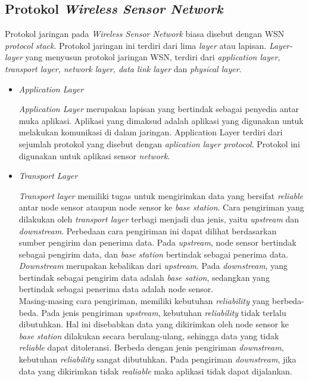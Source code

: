 \subsection{Protokol \textit{Wireless Sensor Network}}
Protokol jaringan pada \textit{Wireless Sensor Network} biasa disebut dengan WSN \textit{protocol stack}. Protokol jaringan ini terdiri dari lima \textit{layer} atau lapisan. \textit{Layer-layer} yang menyusun protokol jaringan WSN, terdiri dari \textit{application layer, transport layer, network layer, data link layer} dan \textit{physical layer}.

\begin{itemize}
    \item \textit{Application Layer}
    
    \textit{Application Layer} merupakan lapisan yang bertindak sebagai penyedia antar muka aplikasi. Aplikasi yang dimaksud adalah aplikasi yang digunakan untuk melakukan komunikasi di dalam jaringan. Application Layer terdiri dari sejumlah protokol yang disebut dengan \textit{aplication layer protocol}. Protokol ini digunakan untuk aplikasi sensor \textit{network}.
    
    \item \textit{Transport Layer}
    
    \textit{Transport layer} memiliki tugas untuk mengirimkan data yang bersifat \textit{reliable} antar node sensor ataupun node sensor ke \textit{base station}. Cara pengiriman yang dilakukan oleh \textit{transport layer} terbagi menjadi dua jenis, yaitu \textit{upstream} dan \textit{downstream}. Perbedaan cara pengiriman ini dapat dilihat berdasarkan sumber pengirim dan penerima data. Pada \textit{upstream}, node sensor bertindak sebagai pengirim data, dan \textit{base station} bertindak sebagai penerima data. \textit{Downstream} merupakan kebalikan dari \textit{upstream}. Pada \textit{downstream}, yang bertindak sebagai pengirim data adalah \textit{base sation}, sedangkan yang bertindak sebagai penerima data adalah node sensor.\\
    Masing-masing cara pengiriman, memiliki kebutuhan \textit{reliability} yang berbeda-beda. Pada jenis pengiriman \textit{upstream}, kebutuhan \textit{reliability} tidak terlalu dibutuhkan. Hal ini disebabkan data yang dikirimkan oleh node sensor ke \textit{base station} dilakukan secara berulang-ulang, sehingga data yang tidak \textit{reliable} dapat ditoleransi. Berbeda dengan jenis pengiriman \textit{downstream}, kebutuhan \textit{reliability} sangat dibutuhkan. Pada pengiriman \textit{downstream}, jika data yang dikirimkan tidak \textit{realiable} maka aplikasi tidak dapat dijalankan. 
    

\end{itemize}
